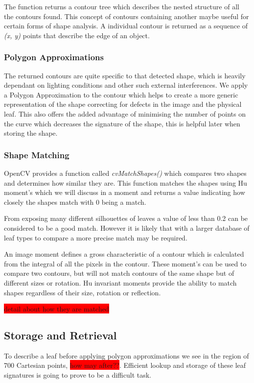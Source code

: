 The function returns a contour tree which describes the nested structure of all the contours found. This concept of contours containing another maybe useful for certain forms of shape analysis. A individual contour is returned as a sequence of \emph{(x, y)} points that describe the edge of an object.


\subsubsection{Polygon Approximations}
The returned contours are quite specific to that detected shape, which is heavily dependant on lighting conditions and other such external interferences. We apply a Polygon Approximation to the contour which helps to create a more generic representation of the shape correcting for defects in the image and the physical leaf. This also offers the added advantage of minimising the number of points on the curve which decreases the signature of the shape, this is helpful later when storing the shape.

\subsubsection{Shape Matching}
OpenCV provides a function called \emph{cvMatchShapes()} which compares two shapes and determines how similar they are. This function matches the shapes using Hu moment's which we will discuss in a moment and returns a value indicating how closely the shapes match with 0 being a match.

From exposing many different silhouettes of leaves a value of less than 0.2 can be considered to be a good match. However it is likely that with a larger database of leaf types to compare a more precise match may be required.

An image moment defines a gross characteristic of a contour which is calculated from the integral of all the pixels in the contour. These moment’s can be used to compare two contours, but will not match contours of the same shape but of different sizes or rotation. Hu invariant moments provide the ability to match shapes regardless of their size, rotation or reflection.

\colorbox{red}{detail about how they are matched}


\subsection{Storage and Retrieval}
To describe a leaf before applying polygon approximations we see in the region of 700 Cartesian points, \colorbox{red}{how may after??}. Efficient lookup and storage of these leaf signatures is going to prove to be a difficult task.


